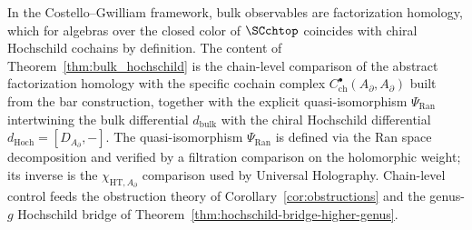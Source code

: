 \begin{remark}
\label{rem:bulk-hochschild-content}
In the Costello--Gwilliam framework, bulk observables are
factorization homology, which for algebras over the closed color
of $\SCchtop$ coincides with chiral Hochschild cochains by definition.
The content of Theorem~\ref{thm:bulk_hochschild} is the chain-level
comparison of the abstract factorization homology with the specific
cochain complex
$C^\bullet_{\mathrm{ch}}(A_\partial, A_\partial)$ built from the bar
construction, together with the explicit quasi-isomorphism
\(\Psi_{\mathrm{Ran}}\) intertwining the bulk
differential $d_{\mathrm{bulk}}$ with the chiral Hochschild
differential \(d_{\mathrm{Hoch}}=[D_{A_\partial},-]\).
The quasi-isomorphism \(\Psi_{\mathrm{Ran}}\) is defined via the Ran
space decomposition and verified by a filtration comparison on the
holomorphic weight; its inverse is the
\(\chi_{\mathrm{HT},A_\partial}\) comparison used by Universal
Holography. Chain-level control feeds the obstruction theory of
Corollary~\ref{cor:obstructions} and the
genus-$g$ Hochschild bridge of
Theorem~\ref{thm:hochschild-bridge-higher-genus}.
\end{remark}

